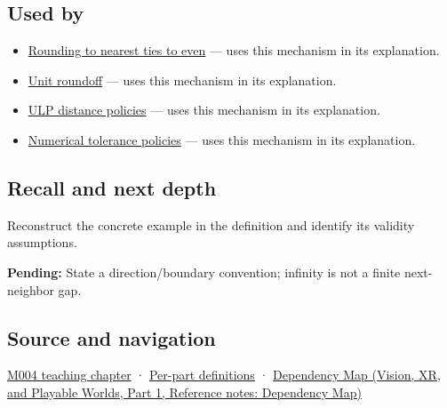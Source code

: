 \subsection{Used by}\label{appendix-14bab4cab9d4-used-by}

\hypertarget{appendix-14bab4cab9d4-used-by}{}

\begin{itemize}
\tightlist
\item
  \hyperref[appendix-614afe1de592]{Rounding to nearest ties to even} --- uses this mechanism in its explanation.
\item
  \hyperref[appendix-bc44f7b42f42]{Unit roundoff} --- uses this mechanism in its explanation.
\item
  \hyperref[appendix-deca299ae4b8]{ULP distance policies} --- uses this mechanism in its explanation.
\item
  \hyperref[appendix-0ec599f8ba27]{Numerical tolerance policies} --- uses this mechanism in its explanation.
\end{itemize}

\subsection{Recall and next depth}\label{appendix-14bab4cab9d4-recall-and-next-depth}

\hypertarget{appendix-14bab4cab9d4-recall-and-next-depth}{}

Reconstruct the concrete example in the definition and identify its validity assumptions.

\textbf{Pending:} State a direction/boundary convention; infinity is not a finite next-neighbor gap.

\subsection{Source and navigation}\label{appendix-14bab4cab9d4-source-and-navigation}

\hypertarget{appendix-14bab4cab9d4-source-and-navigation}{}

\hyperref[01-foundations-i-ch001-a-stretching-ruler-for-real-valued-quantities]{M004 teaching chapter} · \hyperref[appendix-fd090d982a15-m004---parts-61-76]{Per-part definitions} · \href{../07-Vision-XR-and-Playable-Worlds-P01/main.pdf\#nameddest=appendix-4ad47bdd269a}{Dependency Map (Vision, XR, and Playable Worlds, Part 1, Reference notes: Dependency Map)}
